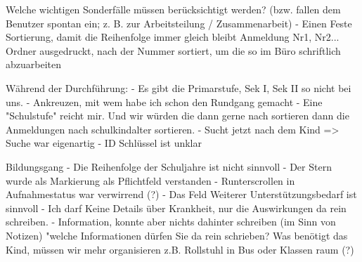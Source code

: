 Welche wichtigen Sonderfälle müssen berücksichtigt werden? (bzw. fallen dem Benutzer spontan ein; z. B. zur Arbeitsteilung / Zusammenarbeit)		
- Einen Feste Sortierung, damit die Reihenfolge immer gleich bleibt	Anmeldung Nr1, Nr2... Ordner ausgedruckt, nach der Nummer sortiert, um die so im Büro schriftlich abzuarbeiten














Während der Durchführung:									
- Es gibt die Primarstufe, Sek I, Sek II so nicht bei uns.
- Ankreuzen, mit wem habe ich schon den Rundgang gemacht
- Eine "Schulstufe" reicht mir. Und wir würden die dann gerne nach sortieren dann die Anmeldungen nach schulkindalter sortieren.
- Sucht jetzt nach dem Kind => Suche war eigenartig	
- ID Schlüssel ist unklar



















Bildungsgang
- Die Reihenfolge der Schuljahre ist nicht sinnvoll
- Der Stern wurde als Markierung als Pflichtfeld verstanden
- Runterscrollen in Aufnahmestatus war verwirrend (?)
- Das Feld Weiterer Unterstützungsbedarf ist sinnvoll
 - Ich darf Keine Details über Krankheit, nur die Auswirkungen da rein schreiben.
- Information, konnte aber nichts dahinter schreiben (im Sinn von Notizen)	"welche Informationen dürfen Sie da rein schrieben? Was benötigt das Kind, müssen wir mehr organisieren z.B. Rollstuhl in Bus oder Klassen raum (?)

















































